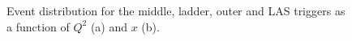 \begin{figure}[!h]
	\caption{Event distribution for the middle, ladder, outer and LAS triggers as a function of $Q^2$ (a) and $x$ (b).}
	\label{pic:triggerxQ2}
\end{figure}

